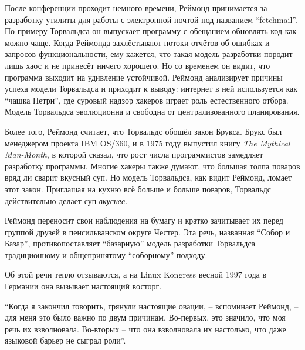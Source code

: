 После конференции проходит немного времени, Реймонд принимается за разработку утилиты для работы с электронной почтой под названием \enquote{fetchmail}. По примеру Торвальдса он выпускает программу с обещанием обновлять код как можно чаще. Когда Реймонда захлёстывают потоки отчётов об ошибках и запросов функциональности, ему кажется, что такая модель разработки породит лишь хаос и не принесёт ничего хорошего. Но со временем он видит, что программа выходит на удивление устойчивой. Реймонд анализирует причины успеха модели Торвальдса и приходит к выводу: интернет в ней используется как \enquote{чашка Петри}, где суровый надзор хакеров играет роль естественного отбора. Модель Торвальдса эволюционна и свободна от централизованного планирования.

Более того, Реймонд считает, что Торвальдс обошёл закон Брукса. Брукс был менеджером проекта IBM OS/360, и в 1975 году выпустил книгу \textit{The Mythical Man-Month}, в которой сказал, что рост числа программистов замедляет разработку программы. Многие хакеры также думают, что большая толпа поваров вряд ли сварит вкусный суп. Но модель Торвальдса, как видит Реймонд, ломает этот закон. Приглашая на кухню всё больше и больше поваров, Торвальдс действительно делает суп \textit{вкуснее}. 

Реймонд переносит свои наблюдения на бумагу и кратко зачитывает их перед группой друзей в пенсильванском округе Честер. Эта речь, названная \enquote{Собор и Базар}, противопоставляет \enquote{базарную} модель разработки Торвальдса традиционному и общепринятому \enquote{соборному} подходу.

Об этой речи тепло отзываются, а на Linux Kongress весной 1997 года в Германии она вызывает настоящий восторг.

\enquote{Когда я закончил говорить, грянули настоящие овации, -- вспоминает Реймонд, -- для меня это было важно по двум причинам. Во-первых, это значило, что моя речь их взволновала. Во-вторых -- что она взволновала их настолько, что даже языковой барьер не сыграл роли}.


